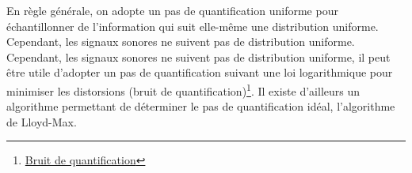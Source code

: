 En règle générale, on adopte un pas de quantification uniforme pour échantillonner de l'information qui suit elle-même une distribution uniforme. Cependant, les signaux sonores ne suivent pas de distribution uniforme. Cependant, les signaux sonores ne suivent pas de distribution uniforme, il peut être utile d'adopter un pas de quantification suivant une loi logarithmique pour minimiser les distorsions (bruit de quantification)\footnote{\href{https://fr.wikipedia.org/wiki/Quantification_\%28signal\%29}{Bruit de quantification}}. Il existe d'ailleurs un algorithme permettant de déterminer le pas de quantification idéal, l'algorithme de Lloyd-Max.
